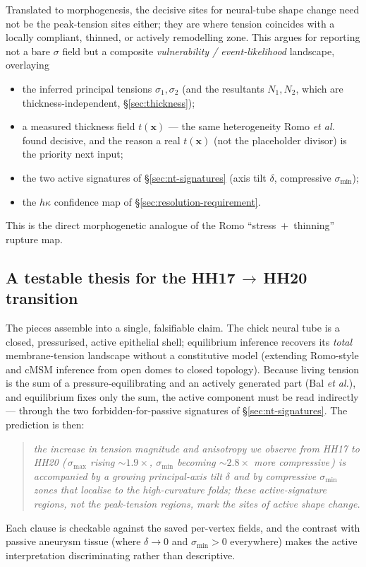 \documentclass[11pt]{article}
\newcommand{\vv}[1]{\bm{#1}}          %
\begin{document}
Translated to morphogenesis, the decisive sites for neural-tube shape change
need not be the peak-tension sites either; they are where tension coincides with a
locally compliant, thinned, or actively remodelling zone.  This argues for
reporting not a bare $\sigma$ field but a composite \emph{vulnerability /
event-likelihood} landscape, overlaying
\begin{itemize}[nosep]
  \item the inferred principal tensions $\sigma_1,\sigma_2$ (and the resultants
        $N_1,N_2$, which are thickness-independent, \S\ref{sec:thickness});
  \item a measured thickness field $t(\vv x)$ --- the same heterogeneity Romo
        \textit{et al.} found decisive, and the reason a real $t(\vv x)$ (not the
        placeholder divisor) is the priority next input;
  \item the two active signatures of \S\ref{sec:nt-signatures} (axis tilt
        $\delta$, compressive $\sigma_{\min}$);
  \item the $h\kappa$ confidence map of \S\ref{sec:resolution-requirement}.
\end{itemize}
This is the direct morphogenetic analogue of the Romo ``stress~$+$~thinning''
rupture map.

\subsection{A testable thesis for the HH17\,$\to$\,HH20 transition}
\label{sec:nt-thesis}

The pieces assemble into a single, falsifiable claim.  The chick neural tube is a
closed, pressurised, active epithelial shell; equilibrium inference recovers its
\emph{total} membrane-tension landscape without a constitutive model (extending
Romo-style and cMSM inference from open domes to closed topology).  Because living
tension is the sum of a pressure-equilibrating and an actively generated part
(Bal \textit{et al.}), and equilibrium fixes only the sum, the active component
must be read indirectly --- through the two forbidden-for-passive signatures of
\S\ref{sec:nt-signatures}.  The prediction is then:
\begin{quote}\itshape
the increase in tension magnitude and anisotropy we observe from HH17 to HH20
(\,$\sigma_{\max}$ rising ${\sim}1.9\times$, $\sigma_{\min}$ becoming
${\sim}2.8\times$ more compressive\,) is accompanied by a growing principal-axis
tilt $\delta$ and by compressive $\sigma_{\min}$ zones that localise to the
high-curvature folds; these active-signature regions, not the peak-tension
regions, mark the sites of active shape change.
\end{quote}
Each clause is checkable against the saved per-vertex fields, and the contrast
with passive aneurysm tissue (where $\delta\!\to\!0$ and $\sigma_{\min}>0$
everywhere) makes the active interpretation discriminating rather than
descriptive.
\end{document}
